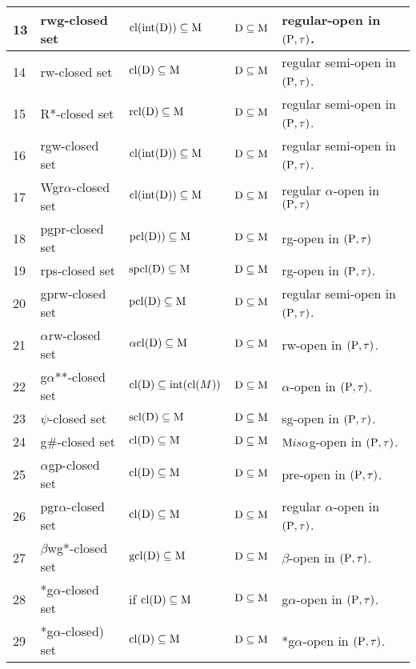 {\begin{longtable}{|p{1cm}|>{\raggedright}p{5cm}|>{\centering}p{2.5cm}|>{\centering}p{1.7cm}|>{\centering}p{2.8cm}|}
\hline
13 & rwg-closed set \cite{Nagaveni6} & $\mathrm{cl}(\mbox{int}(\mathrm{D})) \subseteq \mathrm{M}$ & $\mathrm{D} \subseteq \mathrm{M}$ & regular-open in $(\mathrm{P}, \tau)$.\tabularnewline
\hline
14 & rw-closed set \cite{Benchalli} & $\mathrm{cl}(\mathrm{D}) \subseteq \mathrm{M}$ & $\mathrm{D} \subseteq \mathrm{M}$ & regular semi-open in $(\mathrm{P}, \tau)$.\tabularnewline
\hline
15 & R*-closed set \cite{Janaki3} & $\mathrm{rcl}(\mathrm{D}) \subseteq \mathrm{M}$ & $\mathrm{D} \subseteq \mathrm{M}$ & regular semi-open in $(\mathrm{P}, \tau)$.\tabularnewline
\hline
16 & rgw-closed set \cite{Sanjay} & $\mathrm{cl}(\mbox{int}(\mathrm{D}))\subseteq \mathrm{M}$ & $\mathrm{D} \subseteq \mathrm{M}$ & regular semi-open in $(\mathrm{P}, \tau)$.\tabularnewline
\hline
17 & Wgr$\alpha$-closed set \cite{Janaki1} & $\mathrm{cl}(\mbox{int}(\mathrm{D})) \subseteq \mathrm{M}$ & $\mathrm{D} \subseteq \mathrm{M}$ & regular $\alpha$-open in $(\mathrm{P}, \tau)$\tabularnewline
\hline
18 & pgpr-closed set \cite{Anitha} & $\mathrm{pcl}(\mathrm{D})) \subseteq \mathrm{M}$ & $\mathrm{D} \subseteq \mathrm{M}$ & rg-open in $(\mathrm{P}, \tau)$\tabularnewline
\hline
19 & rps-closed set \cite{Shyala} & $\mathrm{spcl}(\mathrm{D}) \subseteq \mathrm{M}$ & $\mathrm{D} \subseteq \mathrm{M}$ & rg-open in $(\mathrm{P}, \tau)$.\tabularnewline
\hline
20 & gprw-closed set \cite{Sanjay1} & $\mathrm{pcl}(\mathrm{D}) \subseteq \mathrm{M}$ & $\mathrm{D} \subseteq \mathrm{M}$ & regular semi-open in $(\mathrm{P}, \tau)$.\tabularnewline
\hline
21 & $\alpha$rw-closed set \cite{Wali3} & $\alpha\mathrm{cl}(\mathrm{D}) \subseteq \mathrm{M}$ & $\mathrm{D}\subseteq\mathrm{M}$ & rw-open in $(\mathrm{P}, \tau)$.\tabularnewline
\hline
22 & g$\alpha${*}{*}-closed set \cite{key} & $\mathrm{cl}(\mathrm{D}) \subseteq\mbox{int}(\mathrm{cl}(M))$ & $\mathrm{D} \subseteq \mathrm{M}$ & $\alpha$-open in $(\mathrm{P},\tau)$.\tabularnewline
\hline
23 & $\psi$-closed set \cite{Veerakumar2} & $\mathrm{scl}(\mathrm{D}) \subseteq \mathrm{M}$ & $\mathrm{D} \subseteq \mathrm{M}$ & sg-open in $(\mathrm{P}, \tau)$.\tabularnewline
\hline
24 & g\#-closed set \cite{Veerakumar} & $\mathrm{cl}(\mathrm{D}) \subseteq \mathrm{M}$ & $\mathrm{D} \subseteq \mathrm{M}$ & $\mathrm{M} is \alpha$g-open in $(\mathrm{P}, \tau)$.\tabularnewline
\hline
25 & $\alpha$gp-closed set \cite{Navalagi2} & $\mathrm{cl}(\mathrm{D}) \subseteq \mathrm{M}$ & $\mathrm{D} \subseteq \mathrm{M}$ & pre-open in $(\mathrm{P}, \tau)$.\tabularnewline
\hline
26 & pgr$\alpha$-closed set \cite{key} & $\mathrm{cl}(\mathrm{D}) \subseteq \mathrm{M}$ & $\mathrm{D} \subseteq \mathrm{M}$ & regular $\alpha$-open in $(\mathrm{P}, \tau)$.\tabularnewline
\hline
27 & $\beta$wg*-closed set \cite{Dhanapakyam} & $\mathrm{gcl}(\mathrm{D}) \subseteq \mathrm{M}$ & $\mathrm{D} \subseteq \mathrm{M}$ & $\beta$-open in $(\mathrm{P}, \tau)$.\tabularnewline
\hline
28 & *g$\alpha$-closed set \cite{Vigneshwaran} & if $\mathrm{cl}(\mathrm{D}) \subseteq \mathrm{M}$ & $\mathrm{D} \subseteq \mathrm{M}$ & g$\alpha$-open in $(\mathrm{P},\tau)$.\tabularnewline
\hline
29 & *g$\alpha$-closed) set \cite{Vigneshwaran1} & $\mathrm{cl}(\mathrm{D}) \subseteq \mathrm{M}$ & $\mathrm{D} \subseteq \mathrm{M}$ & *g$\alpha$-open in $(\mathrm{P}, \tau)$.\tabularnewline

\end{longtable}}
